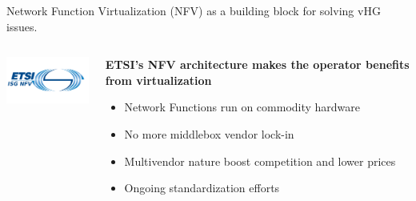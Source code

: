 \documentclass[a4paper]{beamer}
\begin{document}
\begin{frame}{Network Function Virtualization (NFV) as a building block for solving vHG issues.}
	\begin{columns}[T]
		\begin{column}[T]{0.33 \textwidth} 
			\vspace{5em}
			\includegraphics[width=10em]{etsinfv.png}
		\end{column}
										
		\begin{column}[T]{0.66\textwidth} 
										   
			\textbf{ETSI's NFV architecture makes the operator benefits from virtualization}
			\begin{itemize}
				\item Network Functions run on commodity hardware
				\item No more middlebox vendor lock-in
				\item Multivendor nature boost competition and lower prices
				\item Ongoing standardization efforts
			\end{itemize}
			\vspace{3mm}
																																						
		\end{column}
																										
	\end{columns}
\end{frame}
\end{document}
